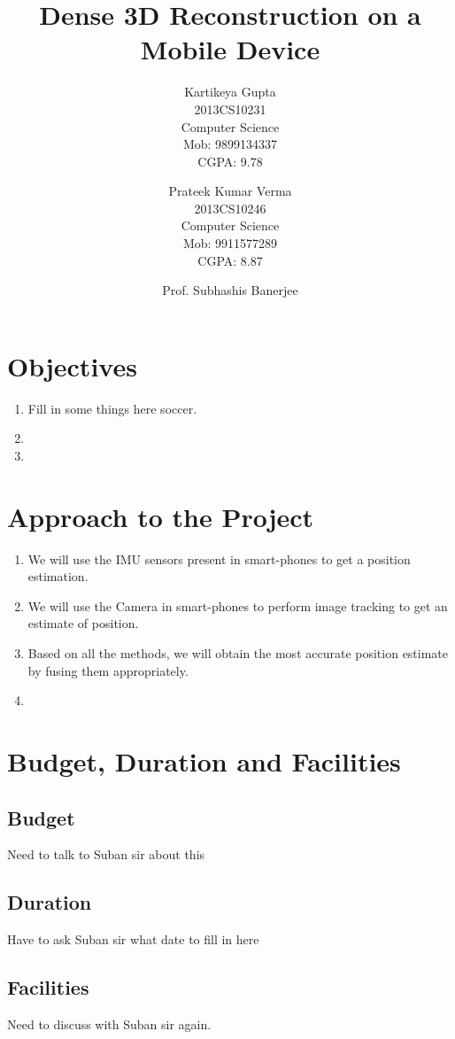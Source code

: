 \documentclass{article}
\title{\vspace*{\fill} Dense 3D Reconstruction on a Mobile Device}
\author{
	Kartikeya Gupta\\ 
	2013CS10231\\
	Computer Science\\
	Mob: 9899134337\\
	CGPA: 9.78
	\and
	Prateek Kumar Verma\\ 
	2013CS10246\\
	Computer Science\\
	Mob: 9911577289\\
	CGPA: 8.87
}
\date{Prof. Subhashis Banerjee \vspace*{\fill}}
\begin{document}
	\maketitle

	\newpage
	\section{Objectives}
		\begin{enumerate}
			\item Fill in some things here soccer.
			\item
			\item 
		\end{enumerate}
	\section{Approach to the Project}
		\begin{enumerate}
			\item We will use the IMU sensors present in smart-phones to get a position estimation.
			\item We will use the Camera in smart-phones to perform image tracking to get an estimate of position.
			\item Based on all the methods, we will obtain the most accurate position estimate by fusing them appropriately.
			\item 

		\end{enumerate}
	\section{Budget, Duration and Facilities}	
		\subsection{Budget}
			Need to talk to Suban sir about this
		\subsection{Duration}
			Have to ask Suban sir what date to fill in here
		\subsection{Facilities}
			Need to discuss with Suban sir again.
\end{document}
